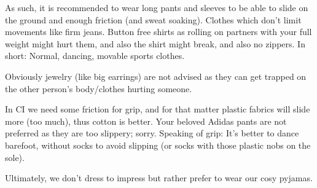 As such, it is recommended to wear long pants and sleeves to be able to slide on the ground and enough friction (and sweat soaking).
Clothes which don't limit movements like firm jeans.
Button free shirts as rolling on partners with your full weight might hurt them, and also the shirt might break, and also no zippers.
In short: Normal, dancing, movable sports clothes.

Obviously jewelry (like big earrings) are not advised as they can get trapped on the other person's body/clothes hurting someone.

In CI we need some friction for grip, and for that matter plastic fabrics will slide more (too much), thus cotton is better.
Your beloved Adidas pants are not preferred as they are too slippery;
sorry.
Speaking of grip: It's better to dance barefoot, without socks to avoid slipping (or socks with those plastic nobs on the sole).

Ultimately, we don't dress to impress but rather prefer to wear our cosy pyjamas.